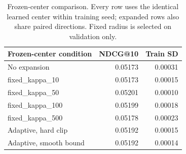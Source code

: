 \begin{table}[t]
\centering\small
\begin{tabular}{lrr}
\toprule
Frozen-center condition & NDCG@10 & Train SD\\
\midrule
No expansion & 0.05173 & 0.00031\\
fixed\_kappa\_10 & 0.05173 & 0.00015\\
fixed\_kappa\_50 & 0.05201 & 0.00010\\
fixed\_kappa\_100 & 0.05199 & 0.00018\\
fixed\_kappa\_500 & 0.05178 & 0.00023\\
Adaptive, hard clip & 0.05192 & 0.00015\\
Adaptive, smooth bound & 0.05192 & 0.00014\\
\bottomrule
\end{tabular}
\caption{Frozen-center comparison. Every row uses the identical learned center within training seed; expanded rows also share paired directions. Fixed radius is selected on validation only.}
\label{tab:frozen-center-radius}
\end{table}
